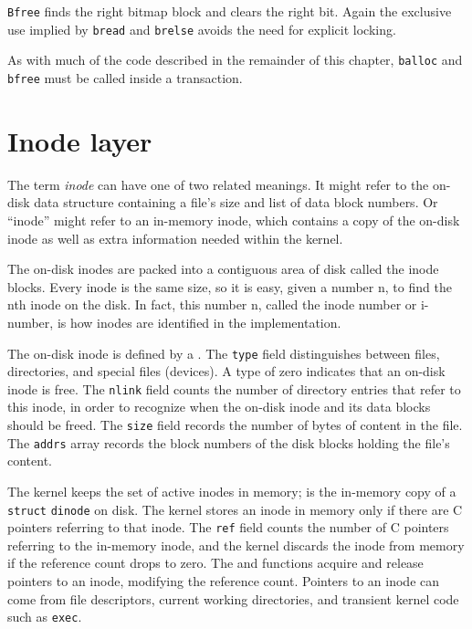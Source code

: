 \lstinline{Bfree}
finds the right bitmap block and clears the right bit.
Again the exclusive use implied by
\lstinline{bread}
and
\lstinline{brelse}
avoids the need for explicit locking.

As with much of the code described in the remainder of this chapter, 
\lstinline{balloc}
and
\lstinline{bfree}
must be called inside a transaction.
\section{Inode layer}

The term 
\textit{inode} 
can have one of two related meanings.
It might refer to the on-disk data structure containing
a file's size and list of data block numbers.
Or ``inode'' might refer to an in-memory inode, which contains
a copy of the on-disk inode as well as extra information needed
within the kernel.

The on-disk inodes
are packed into a contiguous area
of disk called the inode blocks.
Every inode is the same size, so it is easy, given a
number n, to find the nth inode on the disk.
In fact, this number n, called the inode number or i-number,
is how inodes are identified in the implementation.

The on-disk inode is defined by a
.
The 
\lstinline{type}
field distinguishes between files, directories, and special
files (devices).
A type of zero indicates that an on-disk inode is free.
The
\lstinline{nlink}
field counts the number of directory entries that
refer to this inode, in order to recognize when the
on-disk inode and its data blocks should be freed.
The
\lstinline{size}
field records the number of bytes of content in the file.
The
\lstinline{addrs}
array records the block numbers of the disk blocks holding
the file's content.

The kernel keeps the set of active inodes in memory;
is the in-memory copy of a 
\lstinline{struct}
\lstinline{dinode}
on disk.
The kernel stores an inode in memory only if there are
C pointers referring to that inode. The
\lstinline{ref}
field counts the number of C pointers referring to the
in-memory inode, and the kernel discards the inode from
memory if the reference count drops to zero.
The
and
functions acquire and release pointers to an inode,
modifying the reference count.
Pointers to an inode can come from file descriptors,
current working directories, and transient kernel code
such as
\lstinline{exec}.

